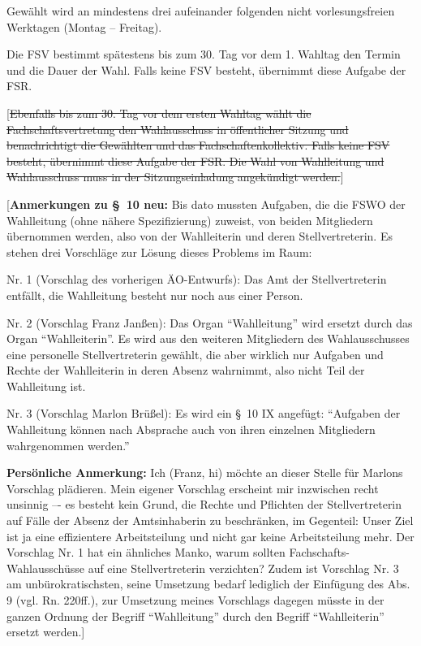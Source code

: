\documentclass[%
draft,%
multilinesections%
]{fswo}
\newcommand\oldT[1]  {{\color{Gray}[\st{#1}]}}
\newcommand\bemFr[1] {{\color{Red}[#1]}}
\newcommand\oldT[1]{}%
\newcommand\bemFr[1]{}%
\begin{document}
\begin{contract}
Gewählt wird an mindestens drei aufeinander folgenden nicht vorlesungsfreien Werktagen (Montag -- Freitag).

Die FSV bestimmt spätestens bis zum 30. Tag vor dem 1. Wahltag den Termin und die Dauer der Wahl.
Falls keine FSV besteht, übernimmt diese Aufgabe der FSR.

\oldT{Ebenfalls bis zum 30. Tag vor dem ersten Wahltag wählt die Fachschaftsvertretung den Wahlausschuss in öffentlicher Sitzung und benachrichtigt die Gewählten und das Fachschaftenkollektiv.
Falls keine FSV besteht, übernimmt diese Aufgabe der FSR.
Die Wahl von Wahlleitung und Wahlausschuss muss in der Sitzungseinladung angekündigt werden.}
\end{contract}

\bemFr{\textbf{Anmerkungen zu \S~10 neu:}
Bis dato mussten Aufgaben, die die FSWO der Wahlleitung (ohne nähere Spezifizierung) zuweist, von beiden Mitgliedern übernommen werden, also von der Wahlleiterin und deren Stellvertreterin.
Es stehen drei Vorschläge zur Lösung dieses Problems im Raum:

Nr. 1 (Vorschlag des vorherigen ÄO-Entwurfs):
Das Amt der Stellvertreterin entfällt, die Wahlleitung besteht nur noch aus einer Person.

Nr. 2 (Vorschlag Franz Janßen):
Das Organ \enquote{Wahlleitung} wird ersetzt durch das Organ \enquote{Wahlleiterin}.
Es wird aus den weiteren Mitgliedern des Wahlausschusses eine personelle Stellvertreterin gewählt,
die aber wirklich nur Aufgaben und Rechte der Wahlleiterin in deren Absenz wahrnimmt, also nicht Teil der Wahlleitung ist.

Nr. 3 (Vorschlag Marlon Brüßel):
Es wird ein \S~10 IX angefügt: \enquote{Aufgaben der Wahlleitung können nach Absprache auch von ihren einzelnen Mitgliedern wahrgenommen werden.}

\textbf{Persönliche Anmerkung:} Ich (Franz, hi) möchte an dieser Stelle für Marlons Vorschlag plädieren.
Mein eigener Vorschlag erscheint mir inzwischen recht unsinnig –- es besteht kein Grund,
die Rechte und Pflichten der Stellvertreterin auf Fälle der Absenz der Amtsinhaberin zu beschränken, im Gegenteil:
Unser Ziel ist ja eine effizientere Arbeitsteilung und nicht gar keine Arbeitsteilung mehr.
Der Vorschlag Nr. 1 hat ein ähnliches Manko, warum sollten Fachschafts-Wahlausschüsse auf eine Stellvertreterin verzichten?
Zudem ist Vorschlag Nr. 3 am unbürokratischsten, seine Umsetzung bedarf lediglich der Einfügung des Abs. 9 (vgl. Rn. 220ff.),
zur Umsetzung meines Vorschlags dagegen müsste in der ganzen Ordnung der Begriff \enquote{Wahlleitung} durch den Begriff \enquote{Wahlleiterin} ersetzt werden.}
\end{document}
